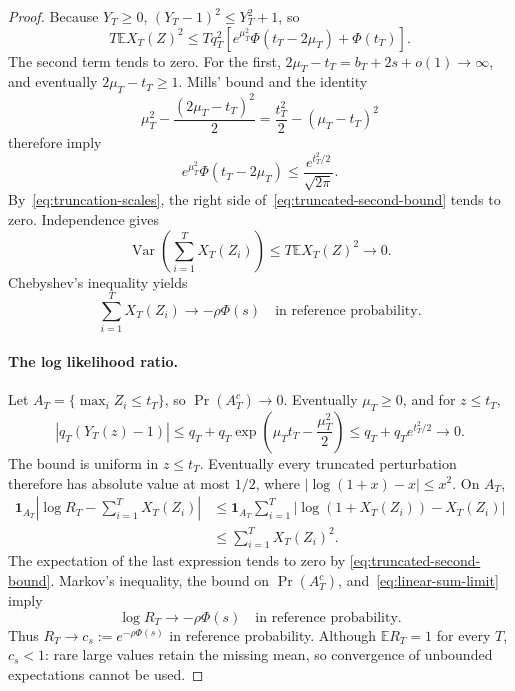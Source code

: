 \documentclass[11pt]{article}
\theoremstyle{remark}
\newcommand{\E}{\mathbb E}
\begin{document}
\begin{proof}
Because $Y_T\geq0$, $(Y_T-1)^2\leq Y_T^2+1$, so
\begin{equation}\label{eq:truncated-second-bound}
 T\E X_T(Z)^2\leq Tq_T^2
 \left[e^{\mu_T^2}\Phi(t_T-2\mu_T)+\Phi(t_T)\right].
\end{equation}
The second term tends to zero. For the first,
$2\mu_T-t_T=b_T+2s+o(1)\to\infty$, and eventually $2\mu_T-t_T\geq1$.
Mills' bound and the identity
\[
 \mu_T^2-\frac{(2\mu_T-t_T)^2}{2}
 =\frac{t_T^2}{2}-(\mu_T-t_T)^2
\]
therefore imply
\[
 e^{\mu_T^2}\Phi(t_T-2\mu_T)
 \leq\frac{e^{t_T^2/2}}{\sqrt{2\pi}}.
\]
By~\eqref{eq:truncation-scales}, the right side
of~\eqref{eq:truncated-second-bound} tends to zero. Independence gives
\[
 \operatorname{Var}\left(\sum_{i=1}^T X_T(Z_i)\right)
 \leq T\E X_T(Z)^2\longrightarrow0.
\]
Chebyshev's inequality yields
\begin{equation}\label{eq:linear-sum-limit}
 \sum_{i=1}^T X_T(Z_i)\longrightarrow-\rho\Phi(s)
 \quad\text{in reference probability}.
\end{equation}

\paragraph{The log likelihood ratio.}
Let $A_T=\{\max_i Z_i\leq t_T\}$, so $\Pr(A_T^c)\to0$.
Eventually $\mu_T\geq0$, and for $z\leq t_T$,
\[
 |q_T(Y_T(z)-1)|
 \leq q_T+q_T\exp\left(\mu_Tt_T-\frac{\mu_T^2}{2}\right)
 \leq q_T+q_Te^{t_T^2/2}\longrightarrow0.
\]
The bound is uniform in $z\leq t_T$. Eventually every truncated perturbation
therefore has absolute value at most $1/2$, where
$|\log(1+x)-x|\leq x^2$. On $A_T$,
\begin{align*}
 \mathbf1_{A_T}\left|\log R_T-\sum_{i=1}^T X_T(Z_i)\right|
 &\leq\mathbf1_{A_T}\sum_{i=1}^T
   |\log(1+X_T(Z_i))-X_T(Z_i)|\\
 &\leq\sum_{i=1}^T X_T(Z_i)^2.
\end{align*}
The expectation of the last expression tends to zero by
\eqref{eq:truncated-second-bound}. Markov's inequality, the bound on
$\Pr(A_T^c)$, and~\eqref{eq:linear-sum-limit} imply
\begin{equation}\label{eq:log-likelihood-limit}
 \log R_T\longrightarrow-\rho\Phi(s)
 \quad\text{in reference probability}.
\end{equation}
Thus $R_T\to c_s:=e^{-\rho\Phi(s)}$ in reference probability.
Although $\E R_T=1$ for every $T$, $c_s<1$: rare large values retain the
missing mean, so convergence of unbounded expectations cannot be used.


\end{proof}
\end{document}
